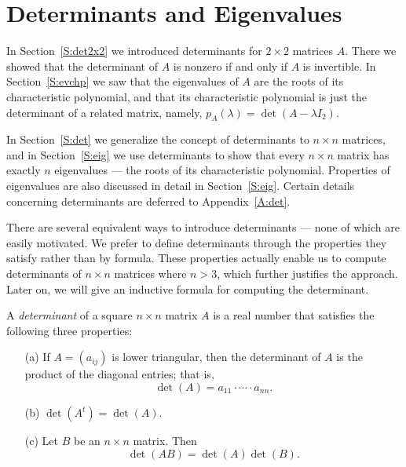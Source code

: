 \chapter{Determinants and Eigenvalues}
\label{C:D&E}

\normalsize

In Section~\ref{S:det2x2} we introduced determinants for $2\times 2$
matrices $A$.  There we showed that the determinant of $A$
is nonzero if and only if $A$ is invertible.  In Section~\ref{S:evchp} 
we saw that the eigenvalues of $A$ are the roots of its 
characteristic polynomial, and that its characteristic polynomial
is just the determinant of a related matrix, namely, 
$p_A(\lambda) = \det(A-\lambda I_2)$. 

In Section~\ref{S:det} we generalize the concept of determinants to
$n\times n$ matrices, and in Section~\ref{S:eig} we use determinants 
to show that every $n\times n$ matrix has exactly $n$ eigenvalues --- 
the roots of its characteristic polynomial.  Properties of eigenvalues 
are also discussed in detail in Section~\ref{S:eig}.
Certain details concerning determinants are deferred to Appendix~\ref{A:det}.



\label{S:det}
 
There are several equivalent ways to introduce determinants --- none of which 
are easily motivated.  We prefer to define determinants through the properties 
they satisfy rather than by formula.  These properties actually enable us to 
compute determinants of $n\times n$ matrices where $n>3$, which further 
justifies the approach. Later on, we will give an inductive formula 
 for computing the determinant. 
 
\begin{Def}  \label{D:determinants}
A {\em determinant\/} of a square $n\times n$ matrix $A$ is a real
number that satisfies the following three properties:
\begin{itemize} 
\item[(a)]  If $A=(a_{ij})$ is lower 
triangular, then
the determinant of $A$ is the product of the diagonal entries;
that is,
\[
\det(A) = a_{11}\cdot\cdots\cdot a_{nn}.
\]
\item[(b)]  $\det(A^t)=\det(A)$.
\item[(c)]  Let $B$ be an $n\times n$ matrix.  
Then
\begin{equation} \label{e:detproduct}
\det(AB) = \det(A)\det(B).
\end{equation}
\end{itemize}
\end{Def} 


